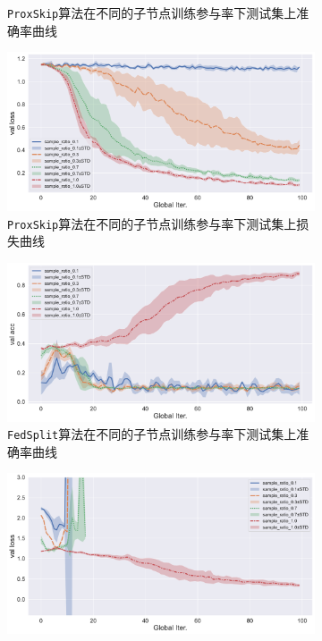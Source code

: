\begin{figure}[ht]
\begin{subfigure}{.5\textwidth}
  \caption{\texttt{ProxSkip}算法在不同的子节点训练参与率下测试集上准确率曲线}
  \label{fig:proxskip-compare-sample-ratio-val-acc}
\end{subfigure}%
\begin{subfigure}{.5\textwidth}
  \centering
  \includegraphics[width=.95\linewidth]{figures/proxskip-compare-sample-ratio-val-loss.pdf}
  \caption{\texttt{ProxSkip}算法在不同的子节点训练参与率下测试集上损失曲线}
  \label{fig:proxskip-compare-sample-ratio-val-loss}
\end{subfigure}
\begin{subfigure}{.5\textwidth}
  \centering
  \includegraphics[width=.95\linewidth]{figures/fedsplit-compare-sample-ratio-val-acc.pdf}
  \caption{\texttt{FedSplit}算法在不同的子节点训练参与率下测试集上准确率曲线}
  \label{fig:fedsplit-compare-sample-ratio-val-acc}
\end{subfigure}%
\begin{subfigure}{.5\textwidth}
  \centering
  \includegraphics[width=.95\linewidth]{figures/fedsplit-compare-sample-ratio-val-loss.pdf}

\end{subfigure}
\end{figure}
